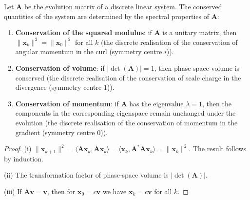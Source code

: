 \begin{theorem}\label{thm:linear_system_conservation}
Let $\mathbf{A}$ be the evolution matrix of a discrete linear system. The conserved quantities of the system are determined by the spectral properties of $\mathbf{A}$:
\begin{enumerate}[label=(\roman*)]
    \item \textbf{Conservation of the squared modulus}: if $\mathbf{A}$ is a unitary matrix, then $\|\mathbf{x}_k\|^2 = \|\mathbf{x}_0\|^2$ for all $k$ (the discrete realisation of the conservation of angular momentum in the curl (symmetry centre $i$)).
    \item \textbf{Conservation of volume}: if $|\det(\mathbf{A})| = 1$, then phase-space volume is conserved (the discrete realisation of the conservation of scale charge in the divergence (symmetry centre $1$)).
    \item \textbf{Conservation of momentum}: if $\mathbf{A}$ has the eigenvalue $\lambda = 1$, then the components in the corresponding eigenspace remain unchanged under the evolution (the discrete realisation of the conservation of momentum in the gradient (symmetry centre $0$)).
\end{enumerate}
\end{theorem}

\begin{proof}
(i) $\|\mathbf{x}_{k+1}\|^2 = \langle \mathbf{A}\mathbf{x}_k, \mathbf{A}\mathbf{x}_k \rangle = \langle \mathbf{x}_k, \mathbf{A}^*\mathbf{A}\mathbf{x}_k \rangle = \|\mathbf{x}_k\|^2$. The result follows by induction.

(ii) The transformation factor of phase-space volume is $|\det(\mathbf{A})|$.

(iii) If $\mathbf{A}\mathbf{v} = \mathbf{v}$, then for $\mathbf{x}_0 = c\mathbf{v}$ we have $\mathbf{x}_k = c\mathbf{v}$ for all $k$.
\end{proof}

